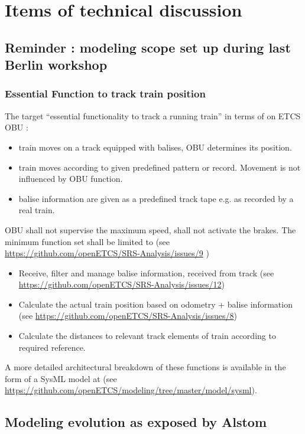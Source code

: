 \documentclass{template/openetcs_report}
\begin{document}
\appendix
\chapter{Items of technical discussion}

\section{Reminder : modeling scope set up during last Berlin workshop}
\subsection{Essential Function to track train position}

The target “essential functionality to track a running train” in terms of on ETCS OBU : 
\begin{itemize}
	\item train moves on a track equipped with balises, OBU determines its position.
	\item train moves according to given predefined pattern or record. Movement is not influenced by OBU function.
	\item balise information are given as a predefined track tape e.g. as recorded by a real train.
\end{itemize}
OBU shall not supervise the maximum speed, shall not activate the brakes. The minimum function set shall be limited to (see \url{https://github.com/openETCS/SRS-Analysis/issues/9} ) 
\begin{itemize}
	\item Receive, filter and manage balise information, received from track (see \url{https://github.com/openETCS/SRS-Analysis/issues/12})
	\item Calculate the actual train position based on odometry + balise information (see \url{https://github.com/openETCS/SRS-Analysis/issues/8})
	\item Calculate the distances to relevant track elements of train according to required reference.
\end{itemize}

A more detailed architectural breakdown of these functions is available in the form of a SysML model at (see \url{https://github.com/openETCS/modeling/tree/master/model/sysml}). 

\section{Modeling evolution as exposed by Alstom}
\end{document}
